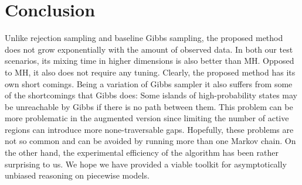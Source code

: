 \section{Conclusion}
\label{sect:conclusion}
Unlike rejection sampling and baseline Gibbs sampling, the proposed method does not grow exponentially with the amount of observed data.
In both our test scenarios, its mixing time in higher dimensions is also better than MH.
Opposed to MH, it also does not require any tuning.
Clearly, the proposed method has its own short comings.
Being a variation of Gibbs sampler it also suffers from some of the shortcomings that Gibbs does:
Some islands of high-probability states may be unreachable by Gibbs if there is no path between them.
This problem can be more problematic in the augmented version since limiting the number of active regions can introduce more none-traversable gaps. 
Hopefully, these problems are not so common and can be avoided by running more than one Markov chain. 
On the other hand, the experimental efficiency of the algorithm has been rather surprising to us.
We hope we have provided a viable toolkit for asymptotically unbiased reasoning on piecewise models.